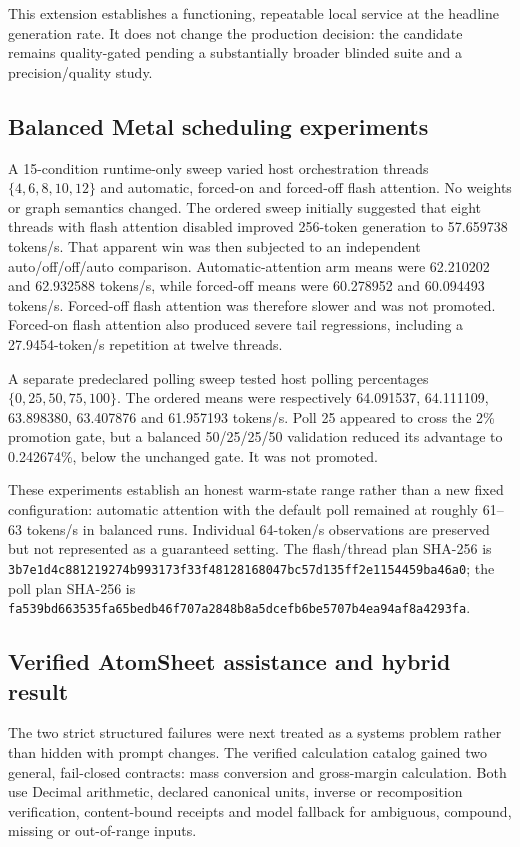 This extension establishes a functioning, repeatable local service at the
headline generation rate.  It does not change the production decision: the
candidate remains quality-gated pending a substantially broader blinded suite
and a precision/quality study.

\subsection{Balanced Metal scheduling experiments}

A 15-condition runtime-only sweep varied host orchestration threads
$\{4,6,8,10,12\}$ and automatic, forced-on and forced-off flash attention.  No
weights or graph semantics changed.  The ordered sweep initially suggested that
eight threads with flash attention disabled improved 256-token generation to
57.659738 tokens/s.  That apparent win was then subjected to an independent
auto/off/off/auto comparison.  Automatic-attention arm means were 62.210202 and
62.932588 tokens/s, while forced-off means were 60.278952 and 60.094493
tokens/s.  Forced-off flash attention was therefore slower and was not
promoted.  Forced-on flash attention also produced severe tail regressions,
including a 27.9454-token/s repetition at twelve threads.

A separate predeclared polling sweep tested host polling percentages
$\{0,25,50,75,100\}$.  The ordered means were respectively 64.091537,
64.111109, 63.898380, 63.407876 and 61.957193 tokens/s.  Poll 25 appeared to
cross the 2\% promotion gate, but a balanced 50/25/25/50 validation reduced its
advantage to 0.242674\%, below the unchanged gate.  It was not promoted.

These experiments establish an honest warm-state range rather than a new fixed
configuration: automatic attention with the default poll remained at roughly
61--63 tokens/s in balanced runs.  Individual 64-token/s observations are
preserved but not represented as a guaranteed setting.  The flash/thread plan
SHA-256 is
\texttt{3b7e1d4c881219274b993173f33f48128168047bc57d135ff2e1154459ba46a0};
the poll plan SHA-256 is
\texttt{fa539bd663535fa65bedb46f707a2848b8a5dcefb6be5707b4ea94af8a4293fa}.

\subsection{Verified AtomSheet assistance and hybrid result}

The two strict structured failures were next treated as a systems problem rather
than hidden with prompt changes.  The verified calculation catalog gained two
general, fail-closed contracts: mass conversion and gross-margin calculation.
Both use Decimal arithmetic, declared canonical units, inverse or recomposition
verification, content-bound receipts and model fallback for ambiguous,
compound, missing or out-of-range inputs.

